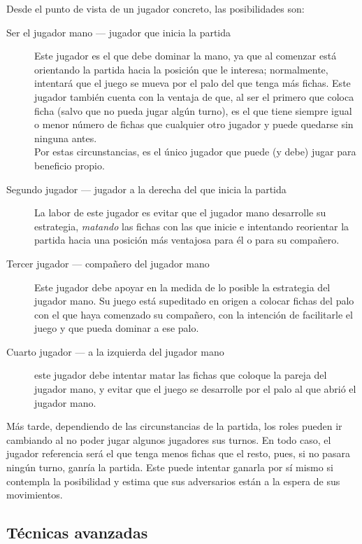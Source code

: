 Desde el punto de vista de un jugador concreto, las posibilidades son: \\
\begin{description}
    \item[Ser el jugador mano --- jugador que inicia la partida] Este jugador es el que debe dominar la mano, ya
        que al comenzar está orientando la partida hacia la posición que le interesa; normalmente, intentará
        que el juego se mueva por el palo del que tenga más fichas. Este jugador también cuenta
        con la ventaja de que, al ser el primero que coloca ficha (salvo que no pueda jugar algún turno), es el que tiene siempre igual o menor número
        de fichas que cualquier otro jugador y puede quedarse sin ninguna antes. \\
        Por estas circunstancias, es el único jugador que puede (y debe) jugar para beneficio propio.
    \item[Segundo jugador --- jugador a la derecha del que inicia la partida] La labor de este jugador es
        evitar que el jugador mano desarrolle su estrategia, \emph{matando} las fichas con las que inicie e intentando
        reorientar la partida hacia una posición más ventajosa para él o para su compañero.
    \item[Tercer jugador --- compañero del jugador mano] Este jugador debe apoyar en la medida de lo posible
        la estrategia del jugador mano. Su juego está supeditado en origen a colocar fichas del palo con el
        que haya comenzado su compañero, con la intención de facilitarle el juego y que pueda dominar a ese palo. \\
    \item[Cuarto jugador --- a la izquierda del jugador mano] este jugador debe intentar matar las fichas que coloque
        la pareja del jugador mano, y evitar que el juego se desarrolle por el palo al que abrió el jugador mano.
\end{description}

Más tarde, dependiendo de las circunstancias de la partida, los roles
pueden ir cambiando al no poder jugar algunos jugadores sus turnos. En
todo caso, el jugador referencia será el que tenga menos fichas que el
resto, pues, si no pasara ningún turno, ganría la partida. Este puede
intentar ganarla por sí mismo si contempla la posibilidad y estima que
sus adversarios están a la espera de sus movimientos.


\subsection{Técnicas avanzadas}

